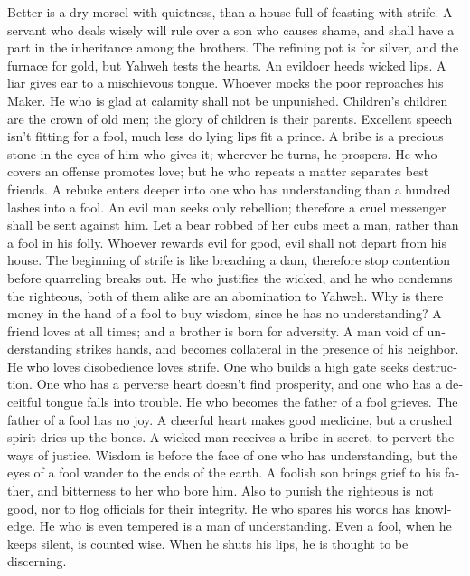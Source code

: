 \begin{paracol}{2}
\begin{otherlanguage}{english}
 Better is a dry morsel with quietness, than a house full
of feasting with strife.  A servant who deals wisely will
rule over a son who causes shame, and shall have a part in the
inheritance among the brothers.  The refining pot is for
silver, and the furnace for gold, but Yahweh tests the hearts.
 An evildoer heeds wicked lips. A liar gives ear to a
mischievous tongue.  Whoever mocks the poor reproaches his
Maker. He who is glad at calamity shall not be unpunished.
 Children's children are the crown of old men; the glory
of children is their parents.  Excellent speech isn't
fitting for a fool, much less do lying lips fit a prince. 
A bribe is a precious stone in the eyes of him who gives it; wherever he
turns, he prospers.  He who covers an offense promotes
love; but he who repeats a matter separates best friends.
 A rebuke enters deeper into one who has understanding
than a hundred lashes into a fool.  An evil man seeks
only rebellion; therefore a cruel messenger shall be sent against him.
 Let a bear robbed of her cubs meet a man, rather than a
fool in his folly.  Whoever rewards evil for good, evil
shall not depart from his house.  The beginning of strife
is like breaching a dam, therefore stop contention before quarreling
breaks out.  He who justifies the wicked, and he who
condemns the righteous, both of them alike are an abomination to Yahweh.
 Why is there money in the hand of a fool to buy wisdom,
since he has no understanding?  A friend loves at all
times; and a brother is born for adversity.  A man void
of understanding strikes hands, and becomes collateral in the presence
of his neighbor.  He who loves disobedience loves strife.
One who builds a high gate seeks destruction.  One who
has a perverse heart doesn't find prosperity, and one who has a
deceitful tongue falls into trouble.  He who becomes the
father of a fool grieves. The father of a fool has no joy.
 A cheerful heart makes good medicine, but a crushed
spirit dries up the bones.  A wicked man receives a bribe
in secret, to pervert the ways of justice.  Wisdom is
before the face of one who has understanding, but the eyes of a fool
wander to the ends of the earth.  A foolish son brings
grief to his father, and bitterness to her who bore him. 
Also to punish the righteous is not good, nor to flog officials for
their integrity.  He who spares his words has knowledge.
He who is even tempered is a man of understanding.  Even
a fool, when he keeps silent, is counted wise. When he shuts his lips,
he is thought to be discerning.


\end{otherlanguage}
\end{paracol}
